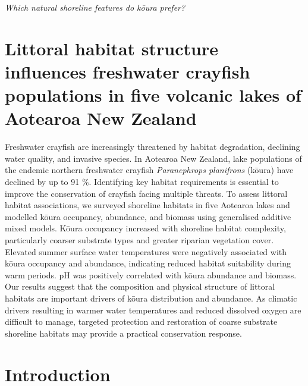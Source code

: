 \documentclass[
  12pt,
  a4paper,
]{scrbook}
\begin{document}
\vspace{1cm}
\begin{center}
\textit{Which natural shoreline features do kōura prefer?}
\end{center}

\afterpage{\pagecolor{thesiscream}}

\newpage{}


\chapter{Littoral habitat structure influences freshwater crayfish
populations in five volcanic lakes of Aotearoa New
Zealand}\label{littoral-habitat-structure-influences-freshwater-crayfish-populations-in-five-volcanic-lakes-of-aotearoa-new-zealand}

Freshwater crayfish are increasingly threatened by habitat degradation,
declining water quality, and invasive species. In Aotearoa New Zealand,
lake populations of the endemic northern freshwater crayfish
\emph{Paranephrops planifrons} (kōura) have declined by up to 91 \%.
Identifying key habitat requirements is essential to improve the
conservation of crayfish facing multiple threats. To assess littoral
habitat associations, we surveyed shoreline habitats in five Aotearoa
lakes and modelled kōura occupancy, abundance, and biomass using
generalised additive mixed models. Kōura occupancy increased with
shoreline habitat complexity, particularly coarser substrate types and
greater riparian vegetation cover. Elevated summer surface water
temperatures were negatively associated with kōura occupancy and
abundance, indicating reduced habitat suitability during warm periods.
pH was positively correlated with kōura abundance and biomass. Our
results suggest that the composition and physical structure of littoral
habitats are important drivers of kōura distribution and abundance. As
climatic drivers resulting in warmer water temperatures and reduced
dissolved oxygen are difficult to manage, targeted protection and
restoration of coarse substrate shoreline habitats may provide a
practical conservation response.

\hfill\break


\chapter{Introduction}\label{introduction-1}
\end{document}
